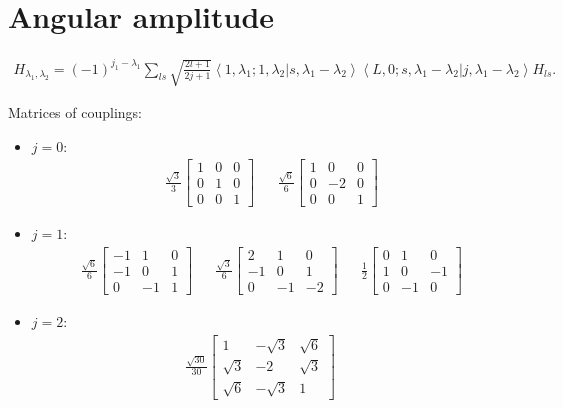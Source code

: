 \documentclass[prd,preprintnumbers,floatfix,
nofootinbib,superscriptaddress]{revtex4}
\begin{document}
\section{Angular amplitude}
\begin{align}
  H_{\lambda_1,\lambda_2} = (-1)^{j_1-\lambda_1} \sum_{ls} \sqrt{\frac{2l+1}{2j+1}}
  \left\langle 1,\lambda_1;1,\lambda_2|s,\lambda_1-\lambda_2 \right\rangle
  \left\langle L,0;s,\lambda_1-\lambda_2|j,\lambda_1-\lambda_2 \right\rangle H_{ls}.
\end{align}

Matrices of couplings:
\begin{itemize}
  \item $j = 0$:
\begin{align*}
  \frac{\sqrt{3}}{3}
  \left[\begin{matrix}1 & 0 & 0\\0 & 1 & 0\\0 & 0 & 1\end{matrix}\right]&&
  \frac{\sqrt{6}}{6}
  \left[\begin{matrix}1 & 0 & 0\\0 & -2 & 0\\0 & 0 & 1\end{matrix}\right]
\end{align*}
  \item $j = 1$:
\begin{align*}
  \frac{\sqrt{6}}{6}
  \left[\begin{matrix}-1 & 1 & 0\\-1 & 0 & 1\\0 & -1 & 1\end{matrix}\right]&&
  \frac{\sqrt{3}}{6}
  \left[\begin{matrix}2 & 1 & 0\\-1 & 0 & 1\\0 & -1 & -2\end{matrix}\right]&&
  \frac{1}{2}
  \left[\begin{matrix}0 & 1 & 0\\1 & 0 & -1\\0 & -1 & 0\end{matrix}\right]
\end{align*}
\item $j = 2$:
\begin{align*}
  \frac{\sqrt{30}}{30}
   \left[\begin{matrix}1 & - \sqrt{3} & \sqrt{6}\\\sqrt{3} & -2 & \sqrt{3}\\\sqrt{6} & - \sqrt{3} & 1\end{matrix}\right]&&

\end{align*}
\end{itemize}
\end{document}
